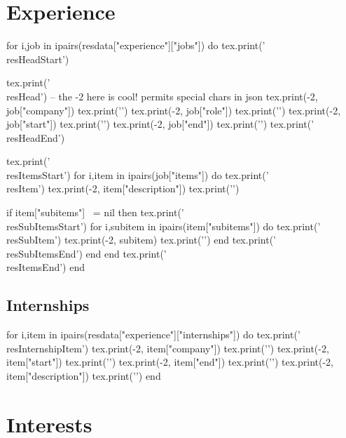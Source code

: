 \documentclass[letterpaper,11pt]{article}
\makeatletter
\newcommand{\luaprint}[1]{\directlua{tex.print(#1)}}
\newcommand{\resHeadStart}{}
\newcommand{\resHead}[4]{
\begin{tabular*}{\textwidth}{l@{\extracolsep{\fill}}r}
\textbf{#1} - {#2} & \textit{#3 - #4} \\
\end{tabular*}\vspace{-7pt}
}
\newcommand{\resHeadEnd}{\vspace{-7pt}}
\newcommand{\resItemsStart}{\begin{itemize}}
\newcommand{\resItem}[1]{\item{#1\vspace{-3pt}}}
\newcommand{\resItemsEnd}{\end{itemize}\vspace{0pt}}
\newcommand{\resSubItemsStart}{\begin{itemize}}
\newcommand{\resSubItem}[1]{\item{#1\vspace{0pt}}}
\newcommand{\resSubItemsEnd}{\end{itemize}\vspace{0pt}}
\newcommand{\resInternshipItem}[4]{\item{\textbf{#1} \small\textit{(#2 - #3)} - \small{#4}\vspace{0pt}}}
\makeatother
\begin{document}
\section{Experience}

\begin{luacode}
for i,job in ipairs(resdata["experience"]["jobs"]) do
    tex.print('\\resHeadStart')

    tex.print('\\resHead{')
    -- the -2 here is cool! permits special chars in json
    tex.print(-2, job["company"])
    tex.print('}{')
    tex.print(-2, job["role"])
    tex.print('}{')
    tex.print(-2, job["start"])
    tex.print('}{')
    tex.print(-2, job["end"])
    tex.print('}')
    tex.print('\\resHeadEnd')

    tex.print('\\resItemsStart')
    for i,item in ipairs(job["items"]) do
        tex.print('\\resItem{')
        tex.print(-2, item["description"])
        tex.print('}')

        if item["subitems"] ~= nil then
            tex.print('\\resSubItemsStart')
            for i,subitem in ipairs(item["subitems"]) do
                tex.print('\\resSubItem{')
                tex.print(-2, subitem)
                tex.print('}')
            end
            tex.print('\\resSubItemsEnd')
        end
    end
    tex.print('\\resItemsEnd')
end
\end{luacode}


{\vspace{0pt}}\subsection*{Internships}{\vspace{0pt}}
\resItemsStart
\begin{luacode}
for i,item in ipairs(resdata["experience"]["internships"]) do
    tex.print('\\resInternshipItem{')
    tex.print(-2, item["company"])
    tex.print('}{')
    tex.print(-2, item["start"])
    tex.print('}{')
    tex.print(-2, item["end"])
    tex.print('}{')
    tex.print(-2, item["description"])
    tex.print('}')
end
\end{luacode}
\resItemsEnd

\section{Interests}
\luaprint{resdata["interests"]}
\end{document}
